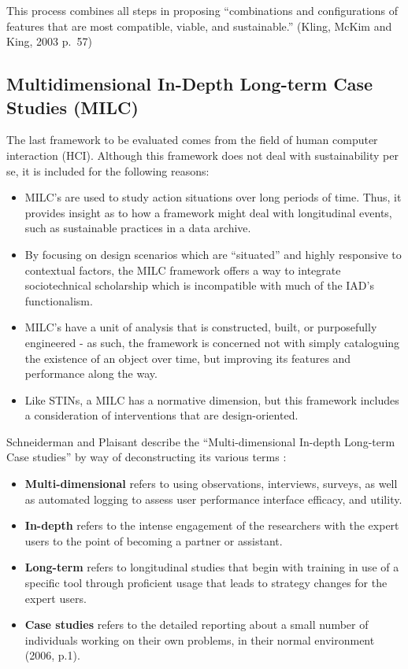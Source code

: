 This process combines all steps in proposing ``combinations and
configurations of features that are most compatible, viable, and
sustainable.'' (Kling, McKim and King, 2003 p.~57)

\subsection*{Multidimensional In-Depth Long-term Case Studies (MILC)}

The last framework to be evaluated comes from the field of human
computer interaction (HCI). Although this framework does not deal with
sustainability per se, it is included for the following reasons:\\

\begin{itemize}
\itemsep1pt\parskip0pt
\item
  MILC's are used to study action situations over long periods of time.
  Thus, it provides insight as to how a framework might deal with
  longitudinal events, such as sustainable practices in a data archive.
\item
  By focusing on design scenarios which are ``situated'' and highly
  responsive to contextual factors, the MILC framework offers a way to
  integrate sociotechnical scholarship which is incompatible with much
  of the IAD's functionalism.
\item
  MILC's have a unit of analysis that is constructed, built, or
  purposefully engineered - as such, the framework is concerned not with
  simply cataloguing the existence of an object over time, but improving
  its features and performance along the way.
\item
  Like STINs, a MILC has a normative dimension, but this framework
  includes a consideration of interventions that are design-oriented.
\end{itemize}

Schneiderman and Plaisant describe the ``Multi-dimensional In-depth
Long-term Case studies'' by way of deconstructing its various terms \citep{shneiderman2006strategies}:

\begin{itemize}
\itemsep1pt\parskip0pt
\item
  \textbf{Multi-dimensional} refers to using observations, interviews,
  surveys, as well as automated logging to assess user performance
  interface efficacy, and utility.
\item
  \textbf{In-depth} refers to the intense engagement of the researchers
  with the expert users to the point of becoming a partner or assistant.
\item
  \textbf{Long-term} refers to longitudinal studies that begin with
  training in use of a specific tool through proficient usage that leads
  to strategy changes for the expert users.
\item
  \textbf{Case studies} refers to the detailed reporting about a small
  number of individuals working on their own problems, in their normal
  environment (2006, p.1).
\end{itemize}

